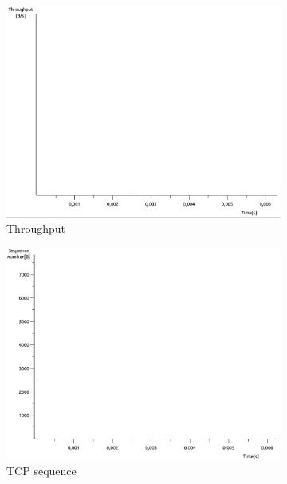 \documentclass[conference,a4paper]{IEEEtran}
\begin{document}
\begin{figure}
 \centering
 \begin{subfigure}[b]{0.2\textwidth}
  \includegraphics[width=\textwidth]{s8-3_th}
  \caption{Throughput}
 \end{subfigure}
 \begin{subfigure}[b]{0.2\textwidth}
  \includegraphics[width=\textwidth]{s8-3_seq}
  \caption{TCP sequence}
 \end{subfigure}
 \begin{subfigure}[b]{0.2\textwidth}

\end{subfigure}
\end{figure}
\end{document}

